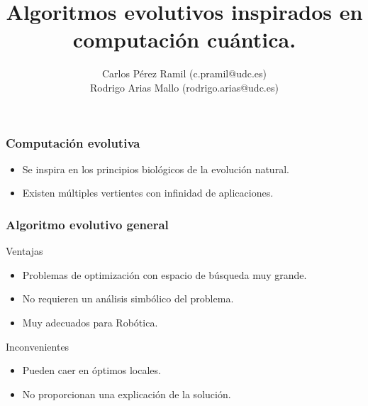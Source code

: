 \documentclass{beamer}
\title{Algoritmos evolutivos inspirados en computación cuántica.}
\author{Carlos Pérez Ramil (c.pramil@udc.es)\\
	Rodrigo Arias Mallo (rodrigo.arias@udc.es)}
\begin{document}




\frame{\titlepage}

\begin{frame}
\frametitle{Computación evolutiva}

\begin{itemize}
\item Se inspira en los principios biológicos de la evolución natural.
\item Existen múltiples vertientes con infinidad de aplicaciones.
\end{itemize}

\end{frame}
\begin{frame}
\frametitle{Algoritmo evolutivo general}

%

\end{frame}
\begin{frame}

\begin{block}{Ventajas}
\begin{itemize}
\item Problemas de optimización con espacio de búsqueda muy grande.
\item No requieren un análisis simbólico del problema.
\item Muy adecuados para Robótica.
\end{itemize}
\end{block}

\begin{block}{Inconvenientes}
\begin{itemize}
\item Pueden caer en óptimos locales.
\item No proporcionan una explicación de la solución.
\end{itemize}
\end{block}

\end{frame}
\end{document}
